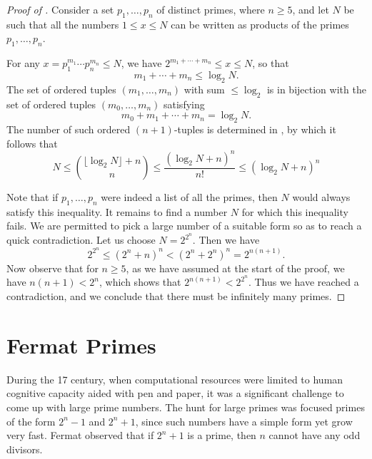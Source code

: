 \begin{proof}[Proof of ]
  Consider a set $p_1,\ldots,p_n$ of distinct primes, where $n\geq 5$, and let $N$ be such that all the numbers $1\leq x\leq N$ can be written as products of the primes $p_1,\ldots,p_n$.

  For any $x=p_1^{m_1}\cdots p_n^{m_n}\leq N$, we have $2^{m_1+\cdots+m_n}\leq x\leq N$, so that
  \begin{equation*}
    m_1+\cdots+m_n \leq \log_2 N.
  \end{equation*}
  The set of ordered tuples $(m_1,\ldots,m_n)$ with sum $\leq \log_2$ is in bijection with the set of ordered tuples $(m_0,\ldots,m_n)$ satisfying
  \begin{equation*}
    m_0+m_1+\cdots+m_n = \log_2 N.
  \end{equation*}
  The number of such ordered $(n+1)$-tuples is determined in , by which it follows that
  \begin{equation*}
    N\leq \binom{\lfloor\log_2 N\rfloor + n}{n}
    \leq \frac{(\log_2 N + n)^{n}}{n!}
    \leq (\log_2 N + n)^{n}
  \end{equation*}

  Note that if $p_1,\ldots,p_n$ were indeed a list of all the primes, then $N$ would always satisfy this inequality. It remains to find a number $N$ for which this inequality fails. We are permitted to pick a large number of a suitable form so as to reach a quick contradiction. Let us choose $N=2^{2^n}$. Then we have
  \begin{equation*}
    2^{2^n}\leq (2^n + n)^{n}<(2^n+2^n)^n=2^{n(n+1)}.
  \end{equation*}
  Now observe that for $n\geq 5$, as we have assumed at the start of the proof, we have $n(n+1)<2^n$, which shows that $2^{n(n+1)}<2^{2^n}$. Thus we have reached a contradiction, and we conclude that there must be infinitely many primes.
\end{proof}

\section{Fermat Primes}

During the 17\supth{} century, when computational resources were limited to human cognitive capacity aided with pen and paper, it was a significant challenge to come up with large prime numbers. The hunt for large primes was focused primes of the form $2^n-1$ and $2^n+1$, since such numbers have a simple form yet grow very fast. Fermat observed that if $2^n+1$ is a prime, then $n$ cannot have any odd divisors.

